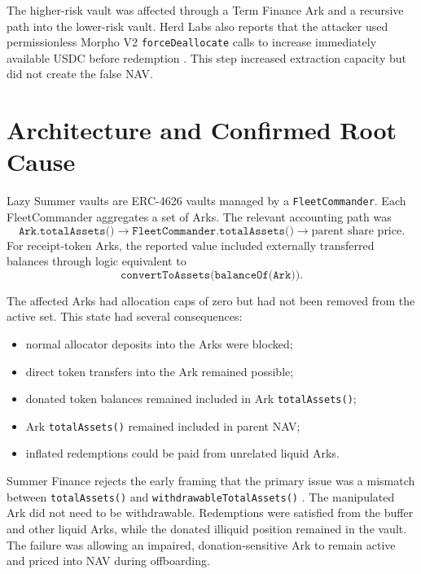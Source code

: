 \documentclass[11pt]{article}
\begin{document}
The higher-risk vault was affected through a Term Finance Ark and a recursive path into the lower-risk vault.  Herd Labs also reports that the attacker used permissionless Morpho V2 \texttt{forceDeallocate} calls to increase immediately available USDC before redemption \cite{herd-analysis}.  This step increased extraction capacity but did not create the false NAV.

\section{Architecture and Confirmed Root Cause}

Lazy Summer vaults are ERC-4626 vaults managed by a \texttt{FleetCommander}.  Each FleetCommander aggregates a set of Arks.  The relevant accounting path was
\begin{equation}
    \texttt{Ark.totalAssets()}
    \longrightarrow
    \texttt{FleetCommander.totalAssets()}
    \longrightarrow
    \text{parent share price}.
\end{equation}
For receipt-token Arks, the reported value included externally transferred balances through logic equivalent to
\begin{equation}
    \texttt{convertToAssets(balanceOf(Ark))}.
\end{equation}

The affected Arks had allocation caps of zero but had not been removed from the active set.  This state had several consequences:
\begin{itemize}[nosep]
    \item normal allocator deposits into the Arks were blocked;
    \item direct token transfers into the Ark remained possible;
    \item donated token balances remained included in Ark \texttt{totalAssets()};
    \item Ark \texttt{totalAssets()} remained included in parent NAV;
    \item inflated redemptions could be paid from unrelated liquid Arks.
\end{itemize}

Summer Finance rejects the early framing that the primary issue was a mismatch between \texttt{totalAssets()} and \texttt{withdrawableTotalAssets()} \cite{summer-postmortem}.  The manipulated Ark did not need to be withdrawable.  Redemptions were satisfied from the buffer and other liquid Arks, while the donated illiquid position remained in the vault.  The failure was allowing an impaired, donation-sensitive Ark to remain active and priced into NAV during offboarding.
\end{document}
